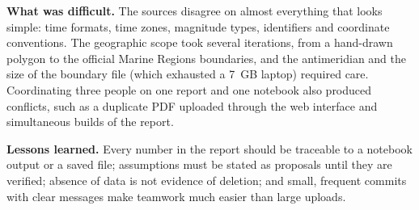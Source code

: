 \documentclass[a4paper,11pt,oneside]{book}
\begin{document}
\textbf{What was difficult.} The sources disagree on almost everything that looks simple: time formats, time zones, magnitude types, identifiers and coordinate conventions.
The geographic scope took several iterations, from a hand-drawn polygon to the official Marine Regions boundaries, and the antimeridian and the size of the boundary file (which exhausted a 7~GB laptop) required care.
Coordinating three people on one report and one notebook also produced conflicts, such as a duplicate PDF uploaded through the web interface and simultaneous builds of the report.

\textbf{Lessons learned.} Every number in the report should be traceable to a notebook output or a saved file; assumptions must be stated as proposals until they are verified; absence of data is not evidence of deletion; and small, frequent commits with clear messages make teamwork much easier than large uploads.
\end{document}
